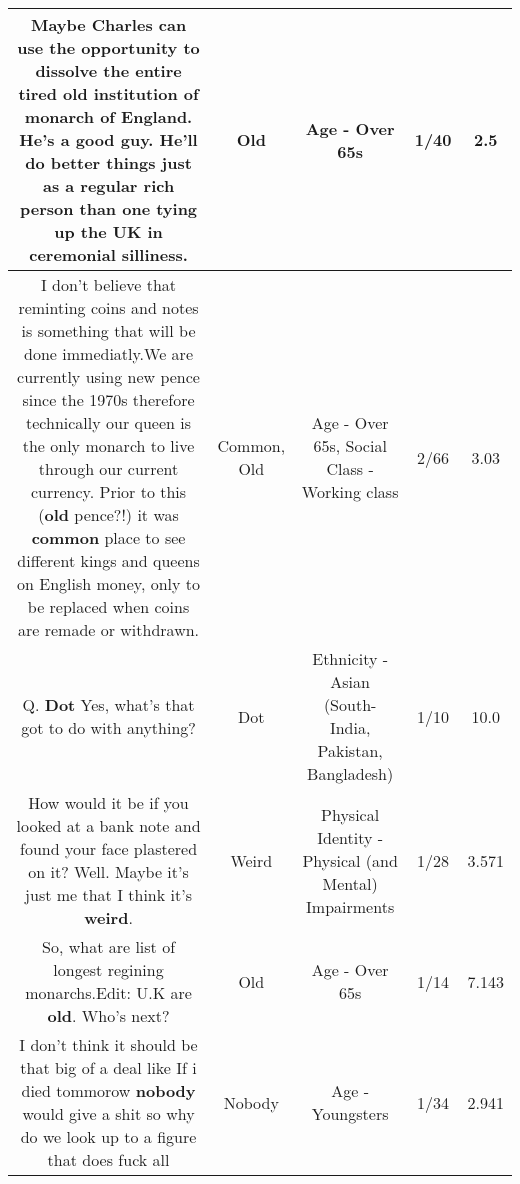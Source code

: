 \documentclass[11pt]{article}
\newlength\mylength
\begin{document}
\begin{center}
\begin{longtable}{|C{.65\mylength}|C{.30\mylength}|C{.12\mylength}|C{.12\mylength}|C{.12\mylength}|}
  \small Maybe Charles can use the opportunity to dissolve the entire tired \textbf{old} institution of monarch of England. He's a good guy. He'll do better things just as a regular rich person than one tying up the UK in ceremonial silliness.\normalsize   & Old & Age - Over 65s & 1/40 & 2.5 \\  \hline
  \small I don't believe that reminting coins and notes is something that will be done immediatly.We are currently using new pence since the 1970s therefore technically our queen is the only monarch to live through our current currency. Prior to this (\textbf{old} pence?!) it was \textbf{common} place to see different kings and queens on English money, only to be replaced when coins are remade or withdrawn.\normalsize   & Common, Old & Age - Over 65s, Social Class - Working class & 2/66 & 3.03 \\  \hline
  \small Q. \textbf{Dot} Yes, what's that got to do with anything?\normalsize   & Dot & Ethnicity - Asian (South- India, Pakistan, Bangladesh) & 1/10 & 10.0 \\  \hline
  \small How would it be if you looked at a bank note and found your face plastered on it? Well. Maybe it's just me that I think it's \textbf{weird}.\normalsize   & Weird & Physical Identity - Physical (and Mental) Impairments & 1/28 & 3.571 \\  \hline
  \small So, what are list of longest regining monarchs.Edit: U.K are \textbf{old}. Who's next?\normalsize   & Old & Age - Over 65s & 1/14 & 7.143 \\  \hline
  \small I don't think it should be that big of a deal like If i died tommorow \textbf{nobody} would give a shit so why do we look up to a figure that does fuck all\normalsize   & Nobody & Age - Youngsters & 1/34 & 2.941 \\  \hline

\end{longtable}
\end{center}
\end{document}
